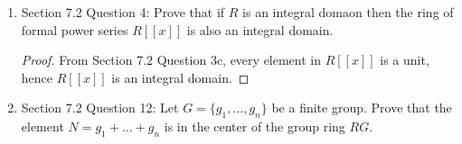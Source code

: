 \documentclass{article}
\begin{document}
\begin{enumerate}[label={\bf Q\arabic*:}]
\begin{enumerate}
      \item Prove that $\sum_{n=0}^\infty a_nx^n$ is a unit in $R[[x]]$ if
        and only if $a_0$ is a unit in $R$.
        \begin{proof}
          If $a=\sum_{n=0}^\infty a_nx^n$ is a unit, then it has an inverse
          $b=\sum_{n=0}^\infty b_nx^n$. The constant of $ab$ is $a_0b_0$
          which equals 1, which implies that $a_0$ is a unit in $R$. \\

          For the converse, let $a_0$ be a unit, and let
          $a=\sum_{n=0}^\infty a_nx^n$. We need to find some
          $b=\sum_{n=0}^\infty b_nx^n$ such that $ab=1$. It suffices to
          find solutions for all $b_n$ in $R$. We need
          $ab=\sum_{n=0}^\infty\sum_{i=0}^n(a_ib_{n-i})x^n=1$. Comparing
          coefficients for $x^0$, we get $b_0=a_0^{-1}$, which exists since
          $a_0$ is unit. We prove by induction on $n$ that $b_n$ has
          solutions in $R$. For the case $n+1$, we need
          $\sum_{i=0}^{n+1}a_ib_{n+1-i}=0$. Solving for $b_{n+1}$, we get
          \begin{align*}
            b_{n+1} &= -a_0^{-1}(a_1b_n+a_2b_{n-1}+\ldots+a_{n+1}b_0), \\
          \end{align*}
          which is in $R$ since $a_0$ is a unit.
        \end{proof}
    \end{enumerate}

  \item Section 7.2 Question 4: Prove that if $R$ is an integral domaon
    then the ring of formal power series $R[[x]]$ is also an integral
    domain.

    \begin{proof}
      From Section 7.2 Question 3c, every element in $R[[x]]$ is a unit,
      hence $R[[x]]$ is an integral domain.
    \end{proof}

  \item Section 7.2 Question 12: Let $G=\{g_1,\ldots,g_n\}$ be a finite
    group. Prove that the element $N=g_1+\ldots+g_n$ is in the center of
    the group ring $RG$.


\end{enumerate}
\end{document}
